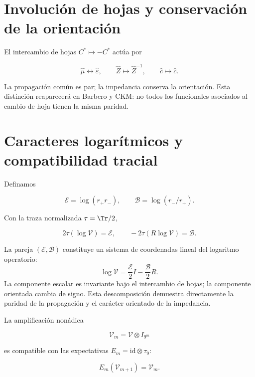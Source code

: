 \section{Involuci\'on de hojas y conservaci\'on de la orientaci\'on}

El intercambio de hojas \(C^*\mapsto-C^*\) act\'ua por

\begin{equation}
\widehat\mu\longleftrightarrow\widehat\varepsilon,\qquad
\widehat Z\longmapsto\widehat Z^{-1},
\qquad
\widehat c\longmapsto\widehat c.
\label{eq:vacuum-sheet}
\end{equation}

La propagaci\'on com\'un es par; la impedancia conserva la orientaci\'on.
Esta distinci\'on reaparecer\'a en Barbero y CKM: no todos los funcionales
asociados al cambio de hoja tienen la misma paridad.

\section{Caracteres logar\'itmicos y compatibilidad tracial}

Definamos

\[
\mathcal E=\log(r_+r_-),\qquad
\mathcal B=\log(r_-/r_+).
\]

Con la traza normalizada \(\tau=\Tr/2\),

\begin{equation}
2\tau(\log\mathcal V)=\mathcal E,
\qquad
-2\tau(R\log\mathcal V)=\mathcal B.
\label{eq:vacuum-traces}
\end{equation}

La pareja \((\mathcal E,\mathcal B)\) constituye un sistema de coordenadas lineal del logaritmo
operatorio:
\begin{equation}
\log\mathcal V
=\frac{\mathcal E}{2}I-\frac{\mathcal B}{2}R.
\label{eq:vacuum-log-decomposition}
\end{equation}
La componente escalar es invariante bajo el intercambio de hojas; la
componente orientada cambia de signo. Esta descomposici\'on demuestra
directamente la paridad de la propagaci\'on y el car\'acter orientado de la
impedancia.

La amplificaci\'on non\'adica

\[
\mathcal V_m=\mathcal V\otimes I_{9^m}
\]

es compatible con las expectativas \(E_m=\mathrm{id}\otimes\tau_9\):

\[
E_m(\mathcal V_{m+1})=\mathcal V_m.
\]

